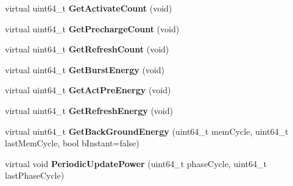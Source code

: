 \begin{DoxyCompactItemize}
\item 
\hypertarget{classMemChannelBase_aff09d5f4063a2ab05ebf4a535d2db384}{virtual uint64\-\_\-t {\bfseries Get\-Activate\-Count} (void)}\label{classMemChannelBase_aff09d5f4063a2ab05ebf4a535d2db384}

\item 
\hypertarget{classMemChannelBase_a1e003c88e1d53077ecbd46c3559f538e}{virtual uint64\-\_\-t {\bfseries Get\-Precharge\-Count} (void)}\label{classMemChannelBase_a1e003c88e1d53077ecbd46c3559f538e}

\item 
\hypertarget{classMemChannelBase_a99c11defc2597136701d55072590c838}{virtual uint64\-\_\-t {\bfseries Get\-Refresh\-Count} (void)}\label{classMemChannelBase_a99c11defc2597136701d55072590c838}

\item 
\hypertarget{classMemChannelBase_a41e3780792062398fe4e643967efd1e4}{virtual uint64\-\_\-t {\bfseries Get\-Burst\-Energy} (void)}\label{classMemChannelBase_a41e3780792062398fe4e643967efd1e4}

\item 
\hypertarget{classMemChannelBase_aa6ee96dd56044aea35c3a1527b722e75}{virtual uint64\-\_\-t {\bfseries Get\-Act\-Pre\-Energy} (void)}\label{classMemChannelBase_aa6ee96dd56044aea35c3a1527b722e75}

\item 
\hypertarget{classMemChannelBase_a34e6a9749f3be5bb7021b7eca6469108}{virtual uint64\-\_\-t {\bfseries Get\-Refresh\-Energy} (void)}\label{classMemChannelBase_a34e6a9749f3be5bb7021b7eca6469108}

\item 
\hypertarget{classMemChannelBase_aff97ffc5ae0a645c6904e6e01aefa90c}{virtual uint64\-\_\-t {\bfseries Get\-Back\-Ground\-Energy} (uint64\-\_\-t mem\-Cycle, uint64\-\_\-t last\-Mem\-Cycle, bool b\-Instant=false)}\label{classMemChannelBase_aff97ffc5ae0a645c6904e6e01aefa90c}

\item 
\hypertarget{classMemChannelBase_a8b6fb4f9cafc741fb5e54d0a032742ea}{virtual void {\bfseries Periodic\-Update\-Power} (uint64\-\_\-t phase\-Cycle, uint64\-\_\-t last\-Phase\-Cycle)}\label{classMemChannelBase_a8b6fb4f9cafc741fb5e54d0a032742ea}

\end{DoxyCompactItemize}
